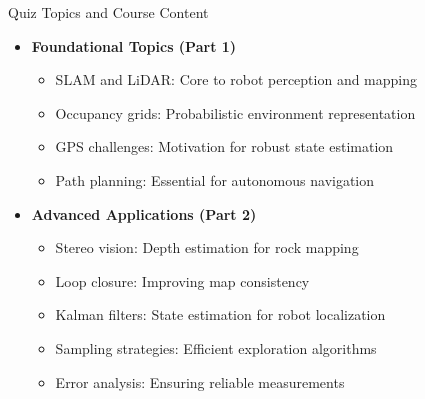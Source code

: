 \documentclass[aspectratio=169]{beamer}
\begin{document}
\begin{frame}{Quiz Topics and Course Content}
\begin{itemize}
    \item \textbf{Foundational Topics (Part 1)}
    \begin{itemize}
        \item SLAM and LiDAR: Core to robot perception and mapping
        \item Occupancy grids: Probabilistic environment representation
        \item GPS challenges: Motivation for robust state estimation
        \item Path planning: Essential for autonomous navigation
    \end{itemize}
    \item \textbf{Advanced Applications (Part 2)}
    \begin{itemize}
        \item Stereo vision: Depth estimation for rock mapping
        \item Loop closure: Improving map consistency
        \item Kalman filters: State estimation for robot localization
        \item Sampling strategies: Efficient exploration algorithms
        \item Error analysis: Ensuring reliable measurements
    \end{itemize}
\end{itemize}
\end{frame}
\end{document}

